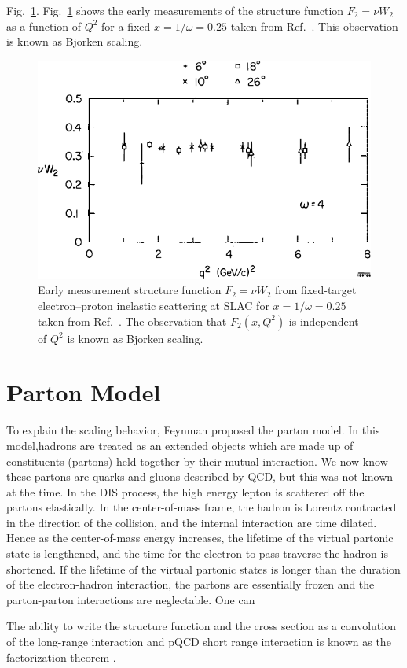 Fig.\ \ref{fig:w2}. Fig.\ \ref{fig:w2} shows the early measurements of the 
structure function $F_2=\nu W_2$ as a function of $Q^2$ for a fixed 
$x=1/\omega=0.25$ taken from Ref.\ \cite{friedman1972}. This observation is 
known as Bjorken scaling\cite{bjorken1969}.
\begin{figure}[htpb!]
	\centering
	\includegraphics[width=0.5\linewidth]{images/nu_W2}
	\caption{Early measurement structure function $F_2=\nu W_2$ from 
	fixed-target electron–proton inelastic scattering at SLAC for 
	$x=1/\omega=0.25$ taken from Ref.\ \cite{friedman1972}. The observation 
	that $F_2(x,Q^2)$ is independent of $Q^2$ is known as Bjorken scaling. }
	\label{fig:w2}
\end{figure}

\section{Parton Model}
\label{sec:parton}
To explain the scaling behavior, Feynman proposed the parton model\cite{feynman1969}.
In this model,hadrons are treated as an extended objects which are made up of 
constituents (partons) held together by their mutual interaction. We now know 
these partons are quarks and gluons described by QCD, but this was not known at 
the time. In the DIS process, the high energy lepton is scattered off the 
partons elastically. In the center-of-mass frame, the hadron is Lorentz 
contracted in the direction of the collision, and the internal interaction are
time dilated. Hence as the center-of-mass energy increases, the lifetime of the
virtual partonic state is lengthened, and the time for the electron to pass 
traverse the hadron is shortened. If the lifetime of the virtual partonic states
is longer than the duration of the electron-hadron interaction, the partons are
essentially frozen and the parton-parton interactions are neglectable. One can


The ability to write the structure function and the cross section as a 
convolution of the long-range interaction and pQCD short range interaction is 
known as the factorization theorem \cite{collins1989}.



